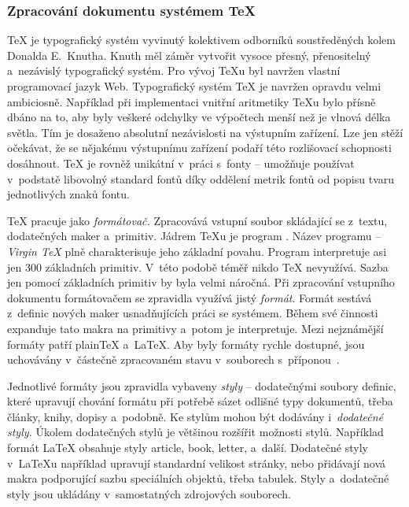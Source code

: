 \documentclass[12pt]{article}
\begin{document}
\subsubsection*{Zpracování dokumentu systémem \TeX}
\TeX{} je typografický systém vyvinutý kolektivem
odborníků soustředěných kolem Donalda E.~Knutha. Knuth měl záměr vytvořit
vysoce přesný, přenositelný a~nezávislý typografický systém. 
Pro vývoj \TeX u byl navržen vlastní programovací jazyk Web. 
Typografický systém \TeX{} je navržen opravdu velmi ambiciosně. Například při
implementaci vnitřní aritmetiky \TeX u bylo přísně dbáno na to, 
aby byly veškeré odchylky ve výpočtech menší než je vlnová délka světla. 
Tím je dosaženo absolutní nezávislosti na výstupním zařízení. Lze jen
stěží očekávat, že se nějakému výstupnímu zařízení podaří této rozlišovací
schopnosti dosáhnout. \TeX{} je rovněž unikátní v~práci s~fonty -- umožňuje
používat v~podstatě libovolný standard fontů díky oddělení metrik fontů 
od popisu tvaru jednotlivých znaků fontu.

\medskip
\TeX{} pracuje jako \emph{formátovač.}
Zpracovává vstupní soubor skládající se z~textu, dodatečných maker
a~primitiv. Jádrem \TeX u je program .
Název programu  -- \emph{Virgin \TeX} plně charakterisuje jeho 
základní povahu. Program  interpretuje asi jen 300 základních
primitiv. V~této podobě téměř nikdo \TeX{} nevyužívá. 
Sazba jen pomocí základních primitiv by byla velmi náročná. Při zpracování
vstupního dokumentu formátovačem se zpravidla využívá 
jistý \emph{formát}. Formát sestává z~definic nových maker
usnadňujících práci se systémem. Během své činnosti  expanduje tato
makra na primitivy a~potom je interpretuje. Mezi nejznámější formáty patří
plain\kern-2pt\TeX{} a~\LaTeX. Aby byly formáty rychle dostupné, jsou
uchovávány v~částečně zpracovaném stavu v~souborech s~příponou~.

\medskip
Jednotlivé formáty jsou zpravidla vybaveny \emph{styly} -- 
dodatečnými soubory definic, které upravují chování formátu při potřebě sázet
odlišné typy dokumentů, třeba články, knihy, dopisy a~podobně. Ke stylům
mohou být dodávány i~\emph{dodatečné styly.}
Úkolem dodatečných stylů je většinou rozšířit možnosti stylů.
Například formát \LaTeX{} obsahuje styly
\textsf{article,} \textsf{book,} \textsf{letter,} a~další. Dodatečné styly 
v~\LaTeX u například upravují standardní velikost stránky, nebo přidávají
nová makra podporující sazbu speciálních objektů, třeba tabulek. 
Styly a~dodatečné styly jsou ukládány v~samostatných zdrojových souborech.
\end{document}
